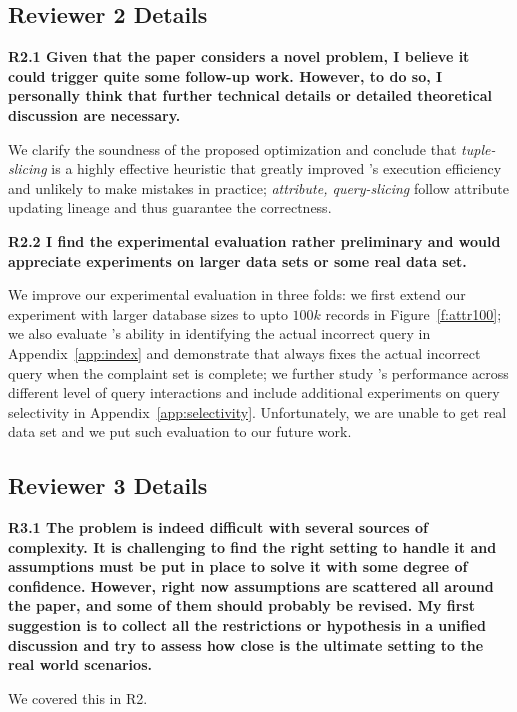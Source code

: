 \subsection*{Reviewer 2 Details}

\noindent \textbf{R2.1 Given that the paper considers a novel problem, I believe it could trigger quite some follow-up work. However, to do so, I personally think that further technical details or detailed theoretical discussion are necessary. }

We clarify the soundness of the proposed optimization and conclude that \emph{tuple-slicing} is a highly effective heuristic that greatly improved \sys's execution efficiency and unlikely to make mistakes in practice; \emph{attribute, query-slicing} follow attribute updating lineage and thus guarantee the correctness.  
 
\noindent \textbf{R2.2 I find the experimental evaluation rather preliminary and would appreciate experiments on larger data sets or some real data set.}

We improve our experimental evaluation in three folds: we first extend our experiment with larger database sizes to upto $100k$ records in Figure~\ref{f:attr100}; we also evaluate
\sys's ability in identifying the actual incorrect query in Appendix~\ref{app:index} and demonstrate that \sys always fixes the actual incorrect query when the complaint set is complete; we further study \sys's performance across different level of query interactions and include additional experiments on query selectivity in Appendix~\ref{app:selectivity}. Unfortunately, we are unable to get real data set and we put such evaluation to our future work. 

\subsection*{Reviewer 3 Details}

\noindent \textbf{R3.1 The problem is indeed difficult with several sources of complexity. It is challenging to find the right setting to handle it and assumptions must be put in place to solve it with some degree of confidence. However, right now assumptions are scattered all around the paper, and some of them should probably be revised.
My first suggestion is to collect all the restrictions or hypothesis in a unified discussion and try to assess how close is the ultimate setting to the real world scenarios.} 

We covered this in R2. 

